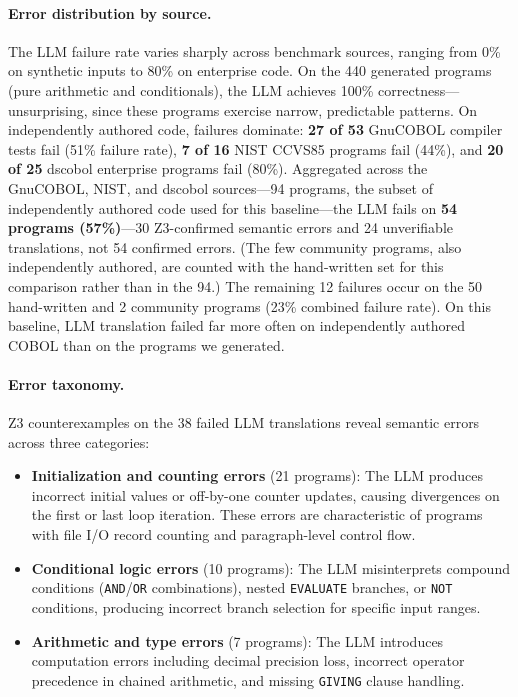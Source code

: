 \documentclass[sigconf,nonacm]{acmart}
\begin{document}
\paragraph{Error distribution by source.} The LLM failure rate varies sharply across benchmark sources, ranging from 0\% on synthetic inputs to 80\% on enterprise code. On the 440 generated programs (pure arithmetic and conditionals), the LLM achieves 100\% correctness---unsurprising, since these programs exercise narrow, predictable patterns. On independently authored code, failures dominate: \textbf{27 of 53} GnuCOBOL compiler tests fail (51\% failure rate), \textbf{7 of 16} NIST CCVS85 programs fail (44\%), and \textbf{20 of 25} dscobol enterprise programs fail (80\%). Aggregated across the GnuCOBOL, NIST, and dscobol sources---94 programs, the subset of independently authored code used for this baseline---the LLM fails on \textbf{54 programs (57\%)}---30 Z3-confirmed semantic errors and 24 unverifiable translations, not 54 confirmed errors. (The few community programs, also independently authored, are counted with the hand-written set for this comparison rather than in the 94.) The remaining 12 failures occur on the 50 hand-written and 2 community programs (23\% combined failure rate). On this baseline, LLM translation failed far more often on independently authored COBOL than on the programs we generated.

\paragraph{Error taxonomy.} Z3 counterexamples on the 38 failed LLM translations reveal semantic errors across three categories:

\begin{itemize}
  \item \textbf{Initialization and counting errors} (21 programs): The LLM produces incorrect initial values or off-by-one counter updates, causing divergences on the first or last loop iteration. These errors are characteristic of programs with file I/O record counting and paragraph-level control flow.

  \item \textbf{Conditional logic errors} (10 programs): The LLM misinterprets compound conditions (\texttt{AND}/\texttt{OR} combinations), nested \texttt{EVALUATE} branches, or \texttt{NOT} conditions, producing incorrect branch selection for specific input ranges.

  \item \textbf{Arithmetic and type errors} (7 programs): The LLM introduces computation errors including decimal precision loss, incorrect operator precedence in chained arithmetic, and missing \texttt{GIVING} clause handling.
\end{itemize}
\end{document}
